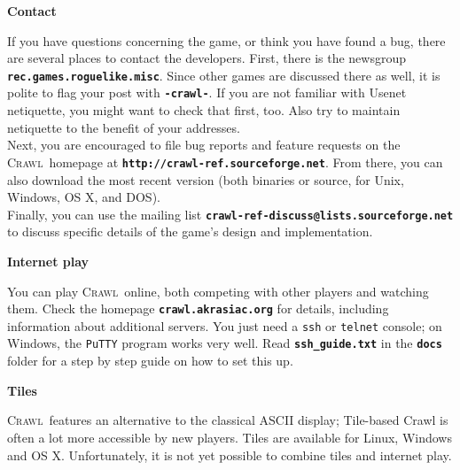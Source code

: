 \documentclass[a4paper,10pt]{article}
\newcommand{\key}[1]{{{\texttt{\textbf{#1}}}}} %
\newcommand{\sex}[1]{{{\textbf{#1}}}} %
\newcommand{\crawl}{\textsc{Crawl}}
\newcommand{\para}{\vspace{1.5ex}}
\begin{document}
\para\para

\sex{Contact}

\para
	    
If you have questions concerning the game, or think you have found a bug, 
there are several places to contact the developers. First, there is the 
newsgroup \key{rec.games.roguelike.misc}. Since other games are 
discussed there as well, it is polite to flag your post with \key{-crawl-}.
If you are not familiar with Usenet netiquette, you might want to check 
that first, too.
Also try to maintain netiquette to the benefit of your addresses.
\\
Next, you are encouraged to file bug reports and feature requests on the 
\crawl\ homepage at \key{http://crawl-ref.sourceforge.net}. From there, you 
can also download the most recent version (both binaries or source, for 
Unix, Windows, OS X, and DOS).
\\
Finally, you can use the mailing list 
\key{crawl-ref-discuss@lists.sourceforge.net}
to discuss specific details of the game's design and implementation.

\para \para

\sex{Internet play}

\para

You can play \crawl\ online, both competing with other players and watching 
them. Check the homepage \key{crawl.akrasiac.org} for details, including 
information about additional servers. You just need a \texttt{ssh} or 
\texttt{telnet} console; on Windows, the \texttt{PuTTY} program works very 
well. Read \key{ssh\_guide.txt} in the \key{docs} folder for a step by step 
guide on how to set this up.

\para \para

\sex{Tiles}

\para

\crawl\ features an alternative to the classical ASCII display; Tile-based
Crawl is often a lot more accessible by new players. Tiles are available for 
Linux, Windows and OS X.
Unfortunately, it is not yet possible to combine tiles and internet play.
\end{document}
